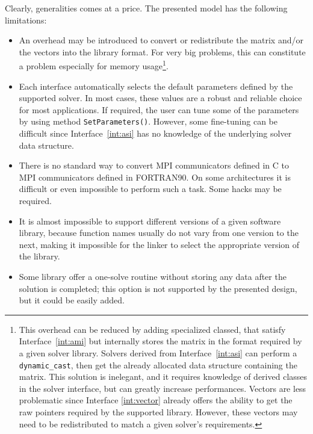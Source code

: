 \documentclass[acmtocl]{acmtrans2m}
\begin{document}
Clearly,  generalities comes at a price. The presented model has the following
limitations:
\begin{itemize}
\item
An overhead may be introduced to convert or redistribute the matrix and/or the
vectors into the library format. For very big problems, this can constitute a
problem especially for memory usage\footnote{
This overhead can be reduced by adding specialized classed, that satisfy
  Interface~\ref{int:ami} but internally stores the matrix in the format
  required by a given solver library. Solvers derived from
  Interface~\ref{int:asi} can perform a {\tt
    dynamic\_cast}, then get the already allocated data structure containing
  the matrix. This solution is inelegant, and it requires knowledge of derived
  classes in the solver interface, but can greatly increase performances.
  Vectors are less problematic since Interface \ref{int:vector} already
  offers the ability to get the raw pointers required by the supported library. However, these vectors may
  need to be redistributed to match a given solver's requirements.}.
\item 
Each interface automatically selects the default parameters defined by the
supported solver. In most cases, these values are a robust and reliable choice
for most applications. If required, the user can tune some of the parameters
by using method \verb!SetParameters()!. However, some fine-tuning can be
difficult since Interface~\ref{int:asi} has no knowledge of the underlying
solver data structure.

\item There
  is no standard way to 
  convert MPI communicators defined in C to MPI communicators defined
  in FORTRAN90. On some architectures it is difficult or even
  impossible to perform such a task. Some hacks may be required.

\item 
It is almost impossible to support different versions of a given software
library, because
function names usually do not vary from one version to the
next, making it impossible for the linker to select the
  appropriate version of the library.

%
%
\item
Some library offer a one-solve routine without storing any data after the
solution is completed; this option is not  supported
by the presented design, but it could be easily added.


\end{itemize}
\end{document}
